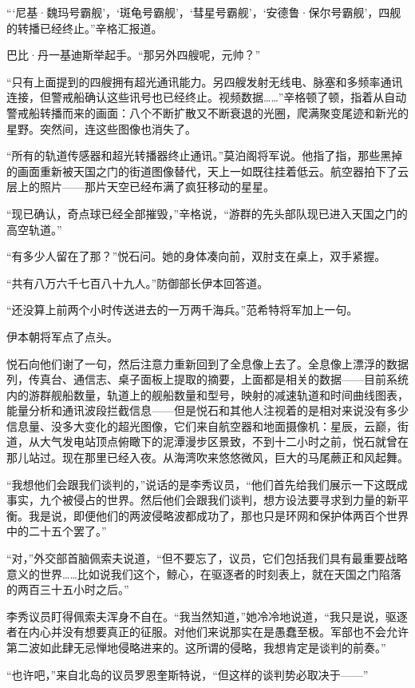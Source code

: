 \documentclass[AutoFakeBold=true]{book}
\begin{document}
```尼基·魏玛号霸舰'，`斑龟号霸舰'，`彗星号霸舰'，`安德鲁·保尔号霸舰'，四舰的转播已经终止。''辛格汇报道。

巴比·丹一基迪斯举起手。``那另外四艘呢，元帅？''

``只有上面提到的四艘拥有超光通讯能力。另四艘发射无线电、脉塞和多频率通讯连接，但警戒船确认这些讯号也已经终止。视频数据……''辛格顿了顿，指着从自动警戒船转播而来的画面：八个不断扩散又不断衰退的光圈，爬满聚变尾迹和新光的星野。突然间，连这些图像也消失了。

``所有的轨道传感器和超光转播器终止通讯。''莫泊阁将军说。他指了指，那些黑掉的画面重新被天国之门的街道图像替代，天上一如既往挂着低云。航空器拍下了云层上的照片——那片天空已经布满了疯狂移动的星星。

``现已确认，奇点球已经全部摧毁，''辛格说，``游群的先头部队现已进入天国之门的高空轨道。''

``有多少人留在了那？''悦石问。她的身体凑向前，双肘支在桌上，双手紧握。

``共有八万六千七百八十九人。''防御部长伊本回答道。

``还没算上前两个小时传送进去的一万两千海兵。''范希特将军加上一句。

伊本朝将军点了点头。

悦石向他们谢了一句，然后注意力重新回到了全息像上去了。全息像上漂浮的数据列，传真台、通信志、桌子面板上提取的摘要，上面都是相关的数据——目前系统内的游群舰船数量，轨道上的舰船数量和型号，映射的减速轨道和时间曲线图表，能量分析和通讯波段拦截信息——但是悦石和其他人注视着的是相对来说没有多少信息量、没多大变化的超光图像，它们来自航空器和地面摄像机：星辰，云巅，街道，从大气发电站顶点俯瞰下的泥潭漫步区景致，不到十二小时之前，悦石就曾在那儿站过。现在那里已经入夜。从海湾吹来悠悠微风，巨大的马尾蕨正和风起舞。

``我想他们会跟我们谈判的，''说话的是李秀议员，``他们首先给我们展示一下这既成事实，九个被侵占的世界。然后他们会跟我们谈判，想方设法要寻求到力量的新平衡。我是说，即便他们的两波侵略波都成功了，那也只是环网和保护体两百个世界中的二十五个罢了。''

``对，''外交部首脑佩索夫说道，``但不要忘了，议员，它们包括我们具有最重要战略意义的世界……比如说我们这个，鲸心，在驱逐者的时刻表上，就在天国之门陷落的两百三十五小时之后。''

李秀议员盯得佩索夫浑身不自在。``我当然知道，''她冷冷地说道，``我只是说，驱逐者在内心并没有想要真正的征服。对他们来说那实在是愚蠢至极。军部也不会允许第二波如此肆无忌惮地侵略进来的。这所谓的侵略，我想肯定是谈判的前奏。''

``也许吧，''来自北岛的议员罗恩奎斯特说，``但这样的谈判势必取决于——''
\end{document}
